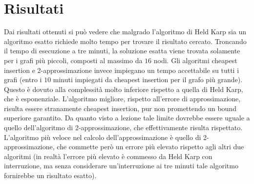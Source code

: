 \normalsize

\clearpage

\section{Risultati\label{sec:risultati}}
Dai risultati ottenuti si può vedere che malgrado l'algoritmo di Held Karp sia un algoritmo esatto richiede molto tempo per trovare il risultato cercato. Troncando il tempo di esecuzione a tre minuti, la soluzione esatta viene trovata solamente per i grafi più piccoli, composti al massimo da $16$ nodi.
Gli algoritmi cheapest insertion e 2-approssimazione invece impiegano un tempo accettabile su tutti i grafi (entro i $10$ minuti impiegati da cheapest insertion per il grafo più grande). Questo è dovuto alla complessità molto inferiore rispetto a quella di Held Karp, che è esponenziale.
L'algoritmo migliore, rispetto all'errore di approssimazione, risulta essere stranamente cheapest insertion, pur non promettendo un bound superiore garantito.
Da quanto visto a lezione tale limite dovrebbe essere uguale a quello dell'algoritmo di 2-approssimazione, che effettivamente risulta rispettato.
L'algoritmo più veloce nel calcolo dell'approssimazione è quello di 2-approssimazione, che commette però un errore più elevato rispetto agli altri due algoritmi (in realtà l'errore più elevato è commesso da Held Karp con interruzione, ma senza considerare un'interruzione ai tre minuti tale algoritmo fornirebbe un risultato esatto).